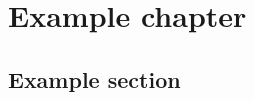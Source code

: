 \chapter{Example chapter}
\label{chapter:example}

\lipsum[1]
\cite{ExampleEntry}


\section{Example section}
\label{section:example}

\lipsum[1]
